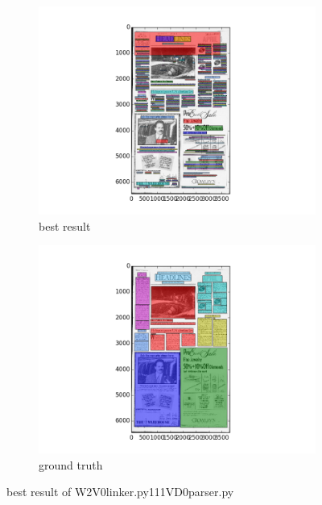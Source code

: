 \documentclass[a4paper,10pt]{article}
\begin{document}
					\begin{figure}
					\centering
					\begin{subfigure}{.5\textwidth}
					  \centering
					  \includegraphics[width=10cm]
					{W2V0linker.py111VD0parser.py.best.png}
					  \caption{best result}
					  \label{fig:sub1}
					\end{subfigure}%
					\begin{subfigure}{.5\textwidth}
					  \centering
					  \includegraphics[width=10cm]
					{W2V0linker.py111VD0parser.py.gt.best.png}
					  \caption{ground truth}
					  \label{fig:sub2}
					\end{subfigure}
					\caption
					{best result of W2V0linker.py111VD0parser.py}
					\label{fig:test}
					\end{figure}
					
\end{document}
